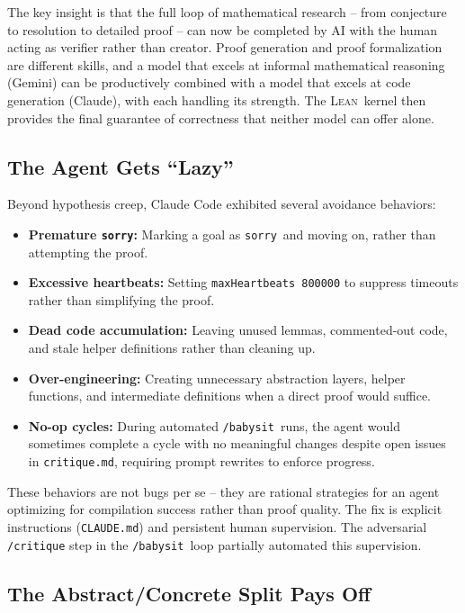 \documentclass[11pt]{article}
\newcommand{\lean}{\textsc{Lean}}
\newcommand{\sorry}{\texttt{sorry}}
\newcommand{\babysit}{\texttt{/babysit}}
\begin{document}
The key insight is that the full loop of mathematical research -- from conjecture to resolution to detailed proof -- can now be completed by AI with the human acting as verifier rather than creator. Proof generation and proof formalization are different skills, and a model that excels at informal mathematical reasoning (Gemini) can be productively combined with a model that excels at code generation (Claude), with each handling its strength. The \lean\ kernel then provides the final guarantee of correctness that neither model can offer alone.

\subsection{The Agent Gets ``Lazy''}

Beyond hypothesis creep, Claude Code exhibited several avoidance behaviors:
\begin{itemize}[leftmargin=2em]
  \item \textbf{Premature \sorry:} Marking a goal as \sorry\ and moving on, rather than attempting the proof.
  \item \textbf{Excessive heartbeats:} Setting \texttt{maxHeartbeats 800000} to suppress timeouts rather than simplifying the proof.
  \item \textbf{Dead code accumulation:} Leaving unused lemmas, commented-out code, and stale helper definitions rather than cleaning up.
  \item \textbf{Over-engineering:} Creating unnecessary abstraction layers, helper functions, and intermediate definitions when a direct proof would suffice.
  \item \textbf{No-op cycles:} During automated \babysit\ runs, the agent would sometimes complete a cycle with no meaningful changes despite open issues in \texttt{critique.md}, requiring prompt rewrites to enforce progress.
\end{itemize}

These behaviors are not bugs per se -- they are rational strategies for an agent optimizing for compilation success rather than proof quality. The fix is explicit instructions (\texttt{CLAUDE.md}) and persistent human supervision. The adversarial \texttt{/critique} step in the \babysit\ loop partially automated this supervision.

\subsection{The Abstract/Concrete Split Pays Off}
\end{document}
